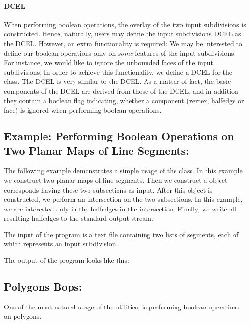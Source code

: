 \paragraph{DCEL}
When performing boolean operations, the overlay of the two input subdivisions is 
constructed. Hence, naturally, users may define the input subdivisions DCEL as the 
 DCEL. 
However, an extra functionality is required: We may be interested 
to define our boolean operations only on {\it some} features of the input subdivisions.
For instance, we would like to ignore the unbounded faces of the input subdivisions.
In order to achieve this functionality, we define a DCEL for the 
 class. 
The  DCEL is very similar to 
the  DCEL.
As a matter of fact, the basic components 
of the  DCEL are 
derived from those of the  DCEL, 
and in addition they contain a boolean flag indicating, 
whether a component (vertex, halfedge or face) is ignored 
when performing boolean operations.

\subsection*{Example: Performing Boolean Operations on Two Planar Maps of Line Segments:}
The following example demonstrates a simple usage of the  class.
In this example we construct two planar maps of line segments. 
Then we construct a  object corresponds 
having these two subsections as input. 
After this object is constructed, we perform an intersection on the two subsections. 
In this example, we are interested only in the halfedges in the intersection.
Finally, we write all resulting halfedges to the standard output stream. 

The input of the program is a text file containing two lists of segments, 
each of which represents an input subdivision.

The output of the program looks like this:


\subsection*{Polygons Bops:}
One of the most natural usage of 
the  utilities, 
is performing boolean operations on polygons.

